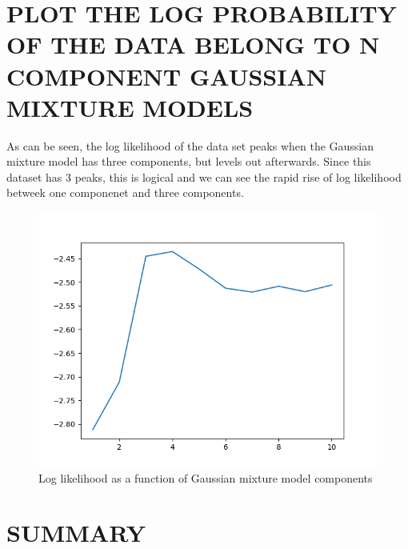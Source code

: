 \documentclass{article}
\begin{document}
\section{\MakeUppercase{Plot the log probability of the data belong to n component Gaussian mixture models}}
As can be seen, the log likelihood of the data set peaks when the Gaussian mixture model has three components, but levels out afterwards. Since this dataset has 3 peaks, this is logical and we can see the rapid rise of log likelihood betweek one componenet and three components. 
\begin{figure}[!htb]
	\centering
	\begin{minipage}{0.49\textwidth}
			\centering
			\includegraphics[width=1\linewidth]{../q1to6pics/q4.png}
			\caption{Log likelihood as a function of Gaussian mixture model components}
	\end{minipage}\hfill
\end{figure}
\section{\MakeUppercase{Summary}}
\end{document}
